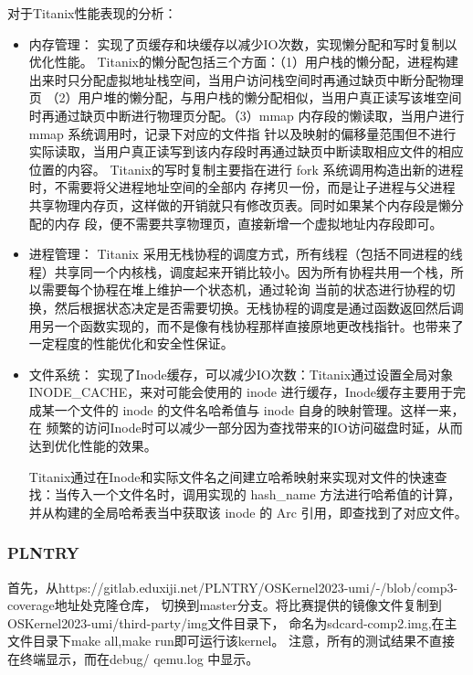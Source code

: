 对于Titanix性能表现的分析：
\begin{itemize}
    \item 内存管理：
    实现了页缓存和块缓存以减少IO次数，实现懒分配和写时复制以优化性能。
    Titanix的懒分配包括三个方面：（1）用户栈的懒分配，进程构建出来时只分配虚拟地址栈空间，当用户访问栈空间时再通过缺页中断分配物理页
    （2）用户堆的懒分配，与用户栈的懒分配相似，当用户真正读写该堆空间时再通过缺页中断进行物理页分配。（3）mmap 内存段的懒读取，当用户进行 mmap 系统调用时，记录下对应的文件指
    针以及映射的偏移量范围但不进行实际读取，当用户真正读写到该内存段时再通过缺页中断读取相应文件的相应位置的内容。
    Titanix的写时复制主要指在进行 fork 系统调用构造出新的进程时，不需要将父进程地址空间的全部内
    存拷贝一份，而是让子进程与父进程共享物理内存页，这样做的开销就只有修改页表。同时如果某个内存段是懒分配的内存
    段，便不需要共享物理页，直接新增一个虚拟地址内存段即可。
    \item 进程管理：
    Titanix 采用无栈协程的调度方式，所有线程（包括不同进程的线程）共享同一个内核栈，调度起来开销比较小。因为所有协程共用一个栈，所以需要每个协程在堆上维护一个状态机，通过轮询
    当前的状态进行协程的切换，然后根据状态决定是否需要切换。无栈协程的调度是通过函数返回然后调用另一个函数实现的，而不是像有栈协程那样直接原地更改栈指针。也带来了一定程度的性能优化和安全性保证。
    \item 文件系统：
    实现了Inode缓存，可以减少IO次数：Titanix通过设置全局对象 INODE_CACHE，来对可能会使用的 inode 进行缓存，Inode缓存主要用于完成某一个文件的 inode 的文件名哈希值与 inode 自身的映射管理。这样一来，在
    频繁的访问Inode时可以减少一部分因为查找带来的IO访问磁盘时延，从而达到优化性能的效果。
    
    Titanix通过在Inode和实际文件名之间建立哈希映射来实现对文件的快速查找：当传入一个文件名时，调用实现的 hash_name 方法进行哈希值的计算，并从构建的全局哈希表当中获取该 inode 的
    Arc 引用，即查找到了对应文件。


\end{itemize}

\subsubsection{PLNTRY}

首先，从https://gitlab.eduxiji.net/PLNTRY/OSKernel2023-umi/-/blob/comp3-coverage地址处克隆仓库，
切换到master分支。将比赛提供的镜像文件复制到OSKernel2023-umi/third-party/img文件目录下，
命名为sdcard-comp2.img,在主文件目录下make all,make run即可运行该kernel。
注意，所有的测试结果不直接在终端显示，而在debug/ qemu.log 中显示。

